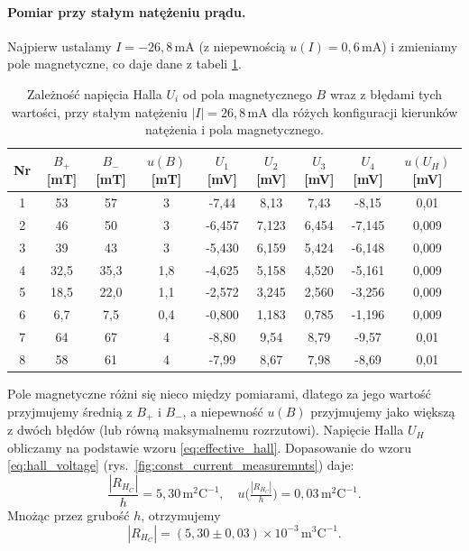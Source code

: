 \documentclass[12pt]{article}
\begin{document}
\paragraph{Pomiar przy stałym natężeniu prądu.}
Najpierw ustalamy $I = -26{,}8\,\mathrm{mA}$ (z niepewnością $u(I) = 0{,}6\,\mathrm{mA}$) i zmieniamy pole magnetyczne, co daje dane z tabeli \ref{tab:const_current_measurements}.

\begin{table}[H]
    \centering
    \begin{tabular}{c|ccc|ccccc}
        \toprule
        Nr & $B_{+}$ [mT] & $B_{-}$ [mT] & $u(B)$ [mT] & $U_1$ [mV] & $U_2$ [mV] & $U_3$ [mV] & $U_4$ [mV] & $u(U_H)$ [mV] \\
        \midrule
        1 & 53 & 57 & 3  & -7{,}44 & 8{,}13 & 7{,}43 & -8{,}15 & 0{,}01 \\
        2 & 46 & 50 & 3 & -6{,}457 & 7{,}123 & 6{,}454 & -7{,}145 & 0{,}009 \\
        3 & 39 & 43 & 3 & -5{,}430 & 6{,}159 & 5{,}424 & -6{,}148 & 0{,}009 \\
        4 & 32{,}5 & 35{,}3 & 1{,}8 & -4{,}625 & 5{,}158 & 4{,}520 & -5{,}161 & 0{,}009 \\
        5 & 18{,}5 & 22{,}0 & 1{,}1   & -2{,}572 & 3{,}245 & 2{,}560 & -3{,}256 & 0{,}009 \\
        6 & 6{,}7  & 7{,}5  & 0{,}4 & -0{,}800 & 1{,}183 & 0{,}785 & -1{,}196 & 0{,}009 \\
        7 & 64 & 67 & 4  & -8{,}80 & 9{,}54 & 8{,}79 & -9{,}57 & 0{,}01 \\
        8 & 58 & 61 & 4 & -7{,}99 & 8{,}67 & 7{,}98 & -8{,}69 & 0{,}01 \\
        \bottomrule
    \end{tabular}
    \caption{Zależność napięcia Halla $U_i$ od pola magnetycznego $B$ wraz z błędami tych wartości, przy stałym natężeniu $|I|=26{,}8\,\mathrm{mA}$ dla różych konfiguracji kierunków natężenia i pola magnetycznego.}
    \label{tab:const_current_measurements}
\end{table}

Pole magnetyczne różni się nieco między pomiarami, dlatego za jego wartość przyjmujemy średnią z $B_{+}$ i $B_{-}$, a niepewność $u(B)$ przyjmujemy jako większą z dwóch błędów (lub równą maksymalnemu rozrzutowi). Napięcie Halla $U_H$ obliczamy na podstawie wzoru \eqref{eq:effective_hall}.  
Dopasowanie do wzoru \eqref{eq:hall_voltage} (rys.~\ref{fig:const_current_measuremnts}) daje:
\[
    \frac{|R_{H_C}|}{h} = 5{,}30\,\mathrm{m}^2\mathrm{C}^{-1}, \quad u\bigl(\tfrac{|R_{H_C}|}{h}\bigr) = 0{,}03\,\mathrm{m}^2\mathrm{C}^{-1}.
\]
Mnożąc przez grubość $h$, otrzymujemy
\begin{equation}
    |R_{H_C}| = (5{,}30 \pm 0{,}03)\times 10^{-3} \,\mathrm{m}^3\mathrm{C}^{-1}.
    \label{eq:hall_constant_current}
\end{equation}
\end{document}
